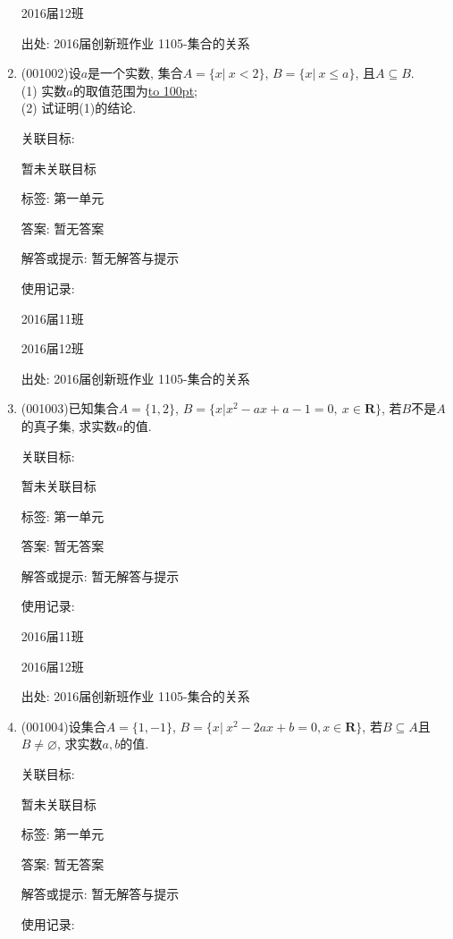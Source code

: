 \documentclass[10pt,a4paper]{article}
\newcommand{\blank}[1]{\underline{\hbox to #1pt{}}}
\begin{document}
\begin{enumerate}[1.]
2016届12班		


出处: 2016届创新班作业	1105-集合的关系
\item { (001002)}设$a$是一个实数, 集合$A=\{x|\ x<2\}$, $B=\{x|\ x\leq a\}$, 且$A \subseteq B$.\\ 
(1) 实数$a$的取值范围为\blank{100};\\ 
(2) 试证明(1)的结论.


关联目标:

暂未关联目标



标签: 第一单元

答案: 暂无答案

解答或提示: 暂无解答与提示

使用记录:

2016届11班		

2016届12班		


出处: 2016届创新班作业	1105-集合的关系
\item { (001003)}已知集合$A=\{1,2\}$, $B=\{x|x^2-ax+a-1=0,\ x\in\mathbf{R}\}$, 若$B$不是$A$的真子集, 求实数$a$的值.


关联目标:

暂未关联目标



标签: 第一单元

答案: 暂无答案

解答或提示: 暂无解答与提示

使用记录:

2016届11班	

2016届12班	


出处: 2016届创新班作业	1105-集合的关系
\item { (001004)}设集合$A=\{1,-1\}$, $B=\{x|\ x^2-2ax+b=0,x\in\mathbf{R}\}$, 若$B\subseteq A$且$B\neq\varnothing$, 求实数$a,b$的值.


关联目标:

暂未关联目标



标签: 第一单元

答案: 暂无答案

解答或提示: 暂无解答与提示

使用记录:


\end{enumerate}
\end{document}
